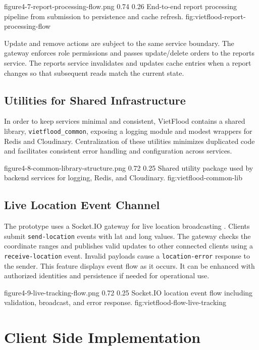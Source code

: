 \vfplaceholderfigure
{figure4-7-report-processing-flow.png}
{0.74}
{0.26}
{End-to-end report processing pipeline from submission to persistence and cache refresh.}
{fig:vietflood-report-processing-flow}

Update and remove actions are subject to the same service boundary. The gateway enforces role permissions and passes update/delete orders to the reports service. The reports service invalidates and updates cache entries when a report changes so that subsequent reads match the current state.

\FloatBarrier
\subsection{Utilities for Shared Infrastructure}

In order to keep services minimal and consistent, VietFlood contains a shared library, \texttt{vietflood\_common}, exposing a logging module and modest wrappers for Redis and Cloudinary. Centralization of these utilities minimizes duplicated code and facilitates consistent error handling and configuration across services.

\vfplaceholderfigure
{figure4-8-common-library-structure.png}
{0.72}
{0.25}
{Shared utility package used by backend services for logging, Redis, and Cloudinary.}
{fig:vietflood-common-lib}

\FloatBarrier
\subsection{Live Location Event Channel}

The prototype uses a Socket.IO gateway for live location broadcasting \cite{socketioDocs}. Clients submit \texttt{send-location} events with lat and long values. The gateway checks the coordinate ranges and publishes valid updates to other connected clients using a \texttt{receive-location} event. Invalid payloads cause a \texttt{location-error} response to the sender. This feature displays event flow as it occurs. It can be enhanced with authorized identities and persistence if needed for operational use.

\vfplaceholderfigure
{figure4-9-live-tracking-flow.png}
{0.72}
{0.25}
{Socket.IO location event flow including validation, broadcast, and error response.}
{fig:vietflood-flow-live-tracking}

\FloatBarrier
\section{Client Side Implementation}

